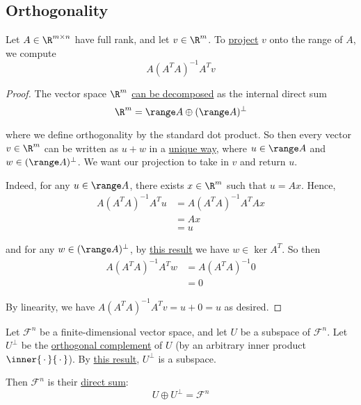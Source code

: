 \subsection{Orthogonality}\label{f90e8d8}

\label{a879f53}

Let $A\in\R^{m\times n}$ have full rank, and let $v\in\R^m$. To
\href{fb705a2}{project} $v$ onto the range of $A$, we compute
$$
  A(A^TA)^{-1}A^Tv
$$

\begin{proof}
  The vector space $\R^m$ \href{e77e5ea}{can be decomposed} as the internal
  direct sum
  $$
    \R^m=\range A\oplus(\range A)^\perp
  $$

  where we define orthogonality by the standard dot product. So then every
  vector $v\in\R^m$ can be written as $u+w$ in a \href{ab66b9d}{unique way},
  where $u\in\range A$ and $w\in(\range A)^\perp$. We want our projection to
  take in $v$ and return $u$.

  Indeed, for any $u\in\range A$, there exists $x\in\R^m$ such that $u=Ax$.
  Hence,
  \begin{align*}
    A(A^TA)^{-1}A^Tu &=A(A^TA)^{-1}A^TAx \\
                     &=Ax                \\
                     &=u
  \end{align*}

  and for any $w\in(\range A)^\perp$, by \href{b2520ce}{this result} we have
  $w\in\ker A^T$. So then
  \begin{align*}
    A(A^TA)^{-1}A^Tw &=A(A^TA)^{-1}0 \\
                     &=0
  \end{align*}

  By linearity, we have $A(A^TA)^{-1}A^Tv=u+0=u$ as desired.
\end{proof}

\label{e77e5ea}

Let $\mathcal F^n$ be a finite-dimensional vector space, and let $U$ be a
subspace of $\mathcal F^n$. Let $U^\perp$ be the \href{c3c519f}{orthogonal
complement} of $U$ (by an arbitrary inner product
$\inner{\,\cdot\,}{\,\cdot\,}$). By \href{d7186eb}{this result}, $U^\perp$ is a
subspace.

Then $\mathcal F^n$ is their \href{c67c961}{direct sum}:
$$
  U\oplus U^\perp=\mathcal F^n
$$

